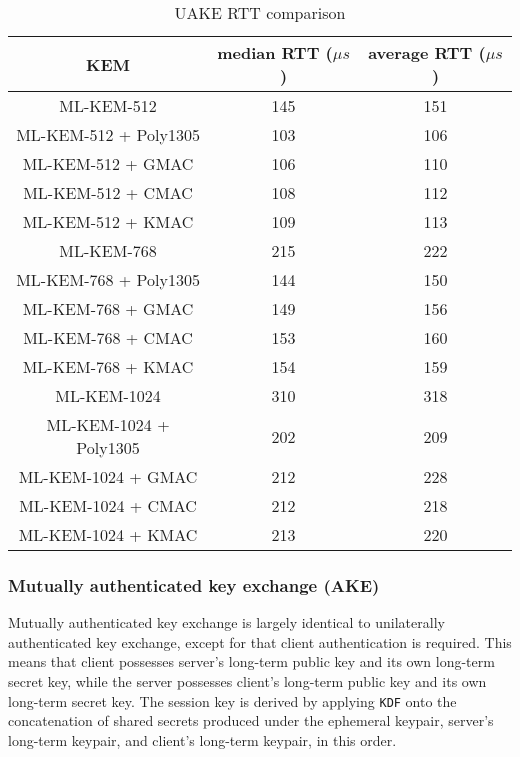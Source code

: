 \documentclass[floatrow,journal=tches,submission]{iacrtrans}
\newcommand{\us}{\mu s}
\begin{document}
\begin{table}[H]
    \caption{UAKE RTT comparison}\label{tbl:uake-rtt}
    \begin{tabular}{|c|c|c|}
        \hline
        KEM & median RTT ($\us$) & average RTT ($\us$) \\
        \hline
        ML-KEM-512 & 145 & 151 \\
        \hline
        ML-KEM-512 + Poly1305 & 103 & 106 \\
        \hline
        ML-KEM-512 + GMAC & 106 & 110 \\
        \hline
        ML-KEM-512 + CMAC & 108 & 112 \\
        \hline
        ML-KEM-512 + KMAC & 109 & 113 \\
        \hline 
        ML-KEM-768 & 215 & 222 \\
        \hline
        ML-KEM-768 + Poly1305 & 144 & 150 \\
        \hline
        ML-KEM-768 + GMAC & 149 & 156 \\
        \hline
        ML-KEM-768 + CMAC & 153 & 160 \\
        \hline
        ML-KEM-768 + KMAC & 154 & 159 \\
        \hline
        ML-KEM-1024 & 310 & 318 \\
        \hline
        ML-KEM-1024 + Poly1305 & 202 & 209 \\
        \hline
        ML-KEM-1024 + GMAC & 212 & 228 \\
        \hline
        ML-KEM-1024 + CMAC & 212 & 218 \\
        \hline
        ML-KEM-1024 + KMAC & 213 & 220 \\
        \hline
    \end{tabular}
\end{table}

\subsubsection{Mutually authenticated key exchange (AKE)}\label{sec:akex}
Mutually authenticated key exchange is largely identical to unilaterally authenticated key exchange, except for that client authentication is required. This means that client possesses server's long-term public key and its own long-term secret key, while the server possesses client's long-term public key and its own long-term secret key. The session key is derived by applying \texttt{KDF} onto the concatenation of shared secrets produced under the ephemeral keypair, server's long-term keypair, and client's long-term keypair, in this order.
\end{document}
